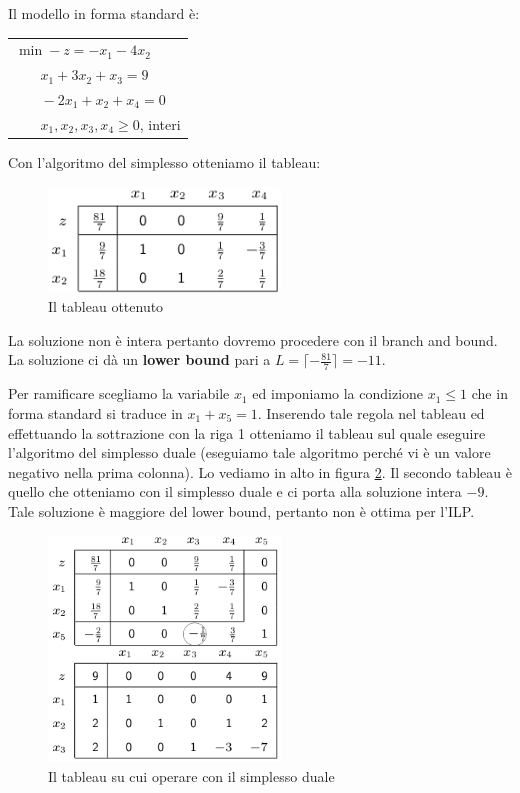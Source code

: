 \documentclass[11pt]{book}
\begin{document}
Il modello in forma standard \`e:

\vspace{11pt}
\begin{center}
  \begin{tabular}{l}
    $\min -z = -x_1 - 4x_2$\\
    $\phantom{min}x_1 + 3x_2 + x_3 = 9$\\
    $\phantom{min}-2x_1 + x_2 + x_4 = 0$\\
    $\phantom{min}x_1, x_2, x_3, x_4 \geq 0$, interi\\
  \end{tabular}
\end{center}
\vspace{11pt}

Con l'algoritmo del simplesso otteniamo il tableau:

\begin{figure}[h!]
  \centering
  \includegraphics[width=0.55\textwidth]{images/cap6tab12.png}
  \caption{Il tableau ottenuto}
  \label{cap6tab12}
\end{figure}

La soluzione non \`e intera pertanto dovremo procedere con il branch
and bound. La soluzione ci d\`a un {\bf lower bound} pari a $L =
\lceil -\frac{81}{7} \rceil = -11$.

Per ramificare scegliamo la variabile $x_1$ ed imponiamo la condizione
$x_1 \leq 1$ che in forma standard si traduce in $x_1 + x_5 =
1$. Inserendo tale regola nel tableau ed effettuando la sottrazione
con la riga 1 otteniamo il tableau sul quale eseguire l'algoritmo del
simplesso duale (eseguiamo tale algoritmo perch\'e vi \`e un valore
negativo nella prima colonna). Lo vediamo in alto in figura
\ref{cap6tab13}. Il secondo tableau \`e quello che otteniamo con il
simplesso duale e ci porta alla soluzione intera $-9$. Tale soluzione
\`e maggiore del lower bound, pertanto non \`e ottima per
l'ILP.

\begin{figure}[h!]
  \centering
  \includegraphics[width=0.55\textwidth]{images/cap6tab13.png}
  \caption{Il tableau su cui operare con il simplesso duale}
  \label{cap6tab13}
\end{figure}
\end{document}
